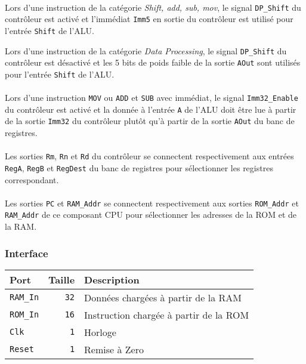 \paragraph{}
Lors d'une instruction de la catégorie \textit{Shift, add, sub, mov}, le signal \texttt{DP\_Shift} du contrôleur est activé et l'immédiat \texttt{Imm5} en sortie du contrôleur est utilisé pour l'entrée \texttt{Shift} de l'ALU.

Lors d'une instruction de la catégorie \textit{Data Processing}, le signal \texttt{DP\_Shift} du contrôleur est désactivé et les 5 bits de poids faible de la sortie \texttt{AOut} sont utilisés pour l'entrée \texttt{Shift} de l'ALU.

\paragraph{}
Lors d'une instruction \texttt{MOV} ou \texttt{ADD} et \texttt{SUB} avec immédiat, le signal \texttt{Imm32\_Enable} du contrôleur est activé
et la donnée à l'entrée \texttt{A} de l'ALU doit être lue à partir de la sortie \texttt{Imm32} du contrôleur plutôt qu'à partir de la sortie \texttt{AOut} du banc de registres.

\paragraph{}
Les sorties \texttt{Rm}, \texttt{Rn} et \texttt{Rd} du contrôleur se connectent respectivement aux entrées \texttt{RegA}, \texttt{RegB} et \texttt{RegDest} du banc de registres pour sélectionner les registres correspondant.

\paragraph{}
Les sorties \texttt{PC} et \texttt{RAM\_Addr} se connectent respectivement aux sorties \texttt{ROM\_Addr} et \texttt{RAM\_Addr} de ce composant CPU pour sélectionner les adresses de la ROM et de la RAM.

\subsubsection{Interface}


\begin{tabular}{|l|r|l|}
\hline
\textbf{Port}		& \textbf{Taille} & \textbf{Description}\\
\hline

\texttt{RAM\_In}	& \texttt{32} & Données chargées à partir de la RAM\\
\hline
\texttt{ROM\_In}	& \texttt{16} & Instruction chargée à partir de la ROM\\
\hline
\texttt{Clk}		&  \texttt{1} & Horloge\\
\hline
\texttt{Reset}		&  \texttt{1} & Remise à Zero\\


\hline
\end{tabular}

